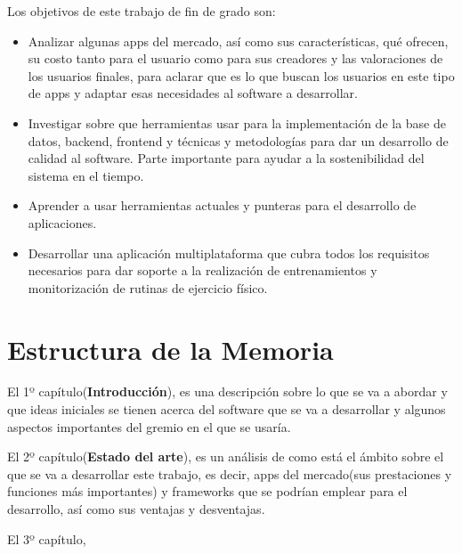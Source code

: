Los objetivos de este trabajo de fin de grado son:

\begin{itemize}
	\item Analizar algunas apps del mercado, así como sus características, qué ofrecen, su costo tanto para el usuario como para sus creadores y las valoraciones de los usuarios finales, para aclarar que es lo que buscan los usuarios en este tipo de apps y adaptar esas necesidades al software a desarrollar.
	\item Investigar sobre que herramientas usar para la implementación de la base de datos, backend, frontend y técnicas y metodologías para dar un desarrollo de calidad al software. Parte importante para ayudar a la sostenibilidad del sistema en el tiempo.
	\item Aprender a usar herramientas actuales y punteras para el desarrollo de aplicaciones.
	\item Desarrollar una aplicación multiplataforma que cubra todos los requisitos necesarios para dar soporte a la realización de entrenamientos y monitorización de rutinas de ejercicio físico.
\end{itemize}

\section{Estructura de la Memoria}

El 1º capítulo(\textbf{Introducción}), es una descripción sobre lo que se va a abordar y que ideas iniciales se tienen acerca del software que se va a desarrollar y algunos aspectos importantes del gremio en el que se usaría.

El 2º capítulo(\textbf{Estado del arte}), es un análisis de como está el ámbito sobre el que se va a desarrollar este trabajo, es decir, apps del mercado(sus prestaciones y funciones más importantes) y frameworks que se podrían emplear para el desarrollo, así como sus ventajas y desventajas.

El 3º capítulo,
